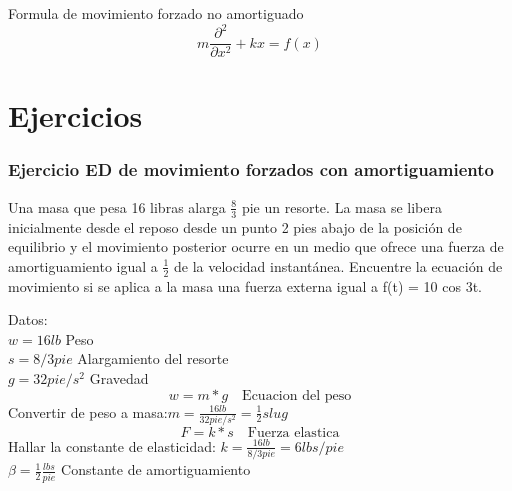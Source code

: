 \documentclass[12pt,a4paper]{article}
\begin{document}
	
		Formula de movimiento forzado no amortiguado\\ 
\begin{equation*}
m\frac{\partial^2 }{\partial x^2}+kx=f(x)
\end{equation*}
		
	
	\section{Ejercicios}
	\subsubsection{Ejercicio ED de movimiento forzados con amortiguamiento}
	
	 Una masa que pesa 16 libras alarga $\frac{8}{3}$ pie un resorte. La 
masa se libera inicialmente desde el reposo desde un punto 
2 pies abajo de la posición de equilibrio y el movimiento 
posterior ocurre en un medio que ofrece una fuerza de 
amortiguamiento igual a $\frac{1}{2}$ de la velocidad instantánea. 
Encuentre la ecuación de movimiento si se aplica a la 
masa una fuerza externa igual a f(t) = 10 cos 3t.\cite{04}
\vspace{0.5cm}

Datos:\\

\vspace{0.2cm}
$w=16 lb$\hspace{0.5cm} Peso\\

\vspace{0.2cm}
$s=8/3 pie$\hspace{0.5cm} Alargamiento del resorte\\

\vspace{0.2cm}
$g=32pie/s^2$\hspace{0.5cm} Gravedad
\begin{equation*}
	w=m*g\quad\text{Ecuacion del peso}
\end{equation*}
Convertir de peso a masa:\space $m=\frac{16 lb}{32 pie/s^2}=\frac{1}{2} slug$
\begin{equation*}
	F=k*s\quad\text{Fuerza elastica}
\end{equation*}
\vspace{1cm}
Hallar la constante de elasticidad: \space $k=\frac{16 lb}{8/3 pie}=6 lbs/pie$\\

\vspace{0.2cm}
$\beta =\frac{1}{2}\frac{lbs}{pie}$\hspace{0.5cm} Constante de amortiguamiento \\
\end{document}
